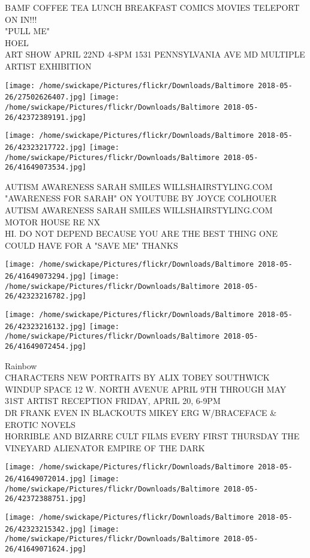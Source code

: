 \documentclass[10pt,letterpaper]{article}
\begin{document}
BAMF COFFEE TEA LUNCH BREAKFAST COMICS MOVIES TELEPORT ON IN!!!\\
"PULL ME"\\
HOEL\\
ART SHOW APRIL 22ND 4{-}8PM 1531 PENNSYLVANIA AVE MD MULTIPLE ARTIST EXHIBITION
\pagebreak

\texttt{[image: /home/swickape/Pictures/flickr/Downloads/Baltimore 2018-05-26/27502626407.jpg]}
\texttt{[image: /home/swickape/Pictures/flickr/Downloads/Baltimore 2018-05-26/42372389191.jpg]}

\texttt{[image: /home/swickape/Pictures/flickr/Downloads/Baltimore 2018-05-26/42323217722.jpg]}
\texttt{[image: /home/swickape/Pictures/flickr/Downloads/Baltimore 2018-05-26/41649073534.jpg]}

AUTISM AWARENESS SARAH SMILES WILLSHAIRSTYLING.COM "AWARENESS FOR SARAH" ON YOUTUBE BY JOYCE COLHOUER\\
AUTISM AWARENESS SARAH SMILES WILLSHAIRSTYLING.COM\\
MOTOR HOUSE RE NX\\
HI.  DO NOT DEPEND BECAUSE YOU ARE THE BEST THING ONE COULD HAVE FOR A "SAVE ME" THANKS
\pagebreak

\texttt{[image: /home/swickape/Pictures/flickr/Downloads/Baltimore 2018-05-26/41649073294.jpg]}
\texttt{[image: /home/swickape/Pictures/flickr/Downloads/Baltimore 2018-05-26/42323216782.jpg]}

\texttt{[image: /home/swickape/Pictures/flickr/Downloads/Baltimore 2018-05-26/42323216132.jpg]}
\texttt{[image: /home/swickape/Pictures/flickr/Downloads/Baltimore 2018-05-26/41649072454.jpg]}

Rainbow\\
CHARACTERS NEW PORTRAITS BY ALIX TOBEY SOUTHWICK WINDUP SPACE 12 W. NORTH AVENUE APRIL 9TH THROUGH MAY 31ST ARTIST RECEPTION FRIDAY, APRIL 20, 6{-}9PM\\
DR FRANK EVEN IN BLACKOUTS MIKEY ERG W/BRACEFACE \& EROTIC NOVELS\\
HORRIBLE AND BIZARRE CULT FILMS EVERY FIRST THURSDAY THE VINEYARD ALIENATOR EMPIRE OF THE DARK
\pagebreak

\texttt{[image: /home/swickape/Pictures/flickr/Downloads/Baltimore 2018-05-26/41649072014.jpg]}
\texttt{[image: /home/swickape/Pictures/flickr/Downloads/Baltimore 2018-05-26/42372388751.jpg]}

\texttt{[image: /home/swickape/Pictures/flickr/Downloads/Baltimore 2018-05-26/42323215342.jpg]}
\texttt{[image: /home/swickape/Pictures/flickr/Downloads/Baltimore 2018-05-26/41649071624.jpg]}
\end{document}
